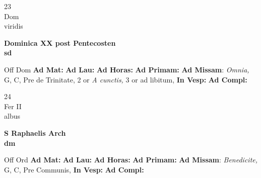 \documentclass[10pt, openany]{book}
\begin{document}
        \begin{center}
            \begin{minipage}{3.5in}
                \vspace{2em}
                \begin{minipage}{0.5in}
                    {\Huge 23} \\
                    {\normalsize Dom} \\
                    {\normalsize viridis}
                \end{minipage}
                \begin{minipage}{3.0in}
                    \textbf{ \large Dominica XX post Pentecosten \\
                    \textnormal{\normalsize sd}} \\ 
                \end{minipage}
                \begin{justify}Off Dom
                    \textbf{Ad Mat: }
                    \textbf{Ad Lau: }
                    \textbf{Ad Horas: }
                    \textbf{Ad Primam: }\textbf{Ad Missam}: \textit{Omnia,} G, C, Pre de Trinitate, 2 or \textit{A cunctis,} 3 or ad libitum,  
                    \textbf{In Vesp: }
                    \textbf{Ad Compl: }
                \end{justify}
            \end{minipage}
        \end{center}
    
        \begin{center}
            \begin{minipage}{3.5in}
                \vspace{2em}
                \begin{minipage}{0.5in}
                    {\Huge 24} \\
                    {\normalsize Fer II} \\
                    {\normalsize albus}
                \end{minipage}
                \begin{minipage}{3.0in}
                    \textbf{ \large S Raphaelis Arch \\
                    \textnormal{\normalsize dm}} \\ 
                \end{minipage}
                \begin{justify}Off Ord
                    \textbf{Ad Mat: }
                    \textbf{Ad Lau: }
                    \textbf{Ad Horas: }
                    \textbf{Ad Primam: }\textbf{Ad Missam}: \textit{Benedicite,} G, C, Pre Communis,  
                    \textbf{In Vesp: }
                    \textbf{Ad Compl: }
                \end{justify}
            \end{minipage}
        \end{center}
    
\end{document}
